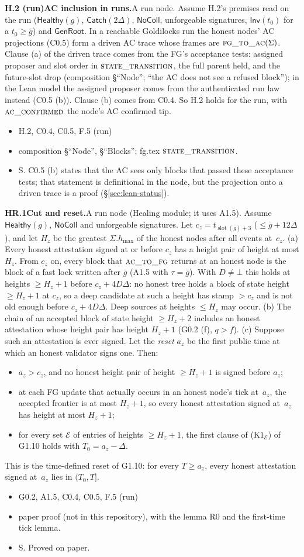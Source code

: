 \documentclass{article}
\newcommand{\slot}{\operatorname{slot}}
\newcommand{\hmax}{h_{\max}}
\newcommand{\fname}[1]{\text{\textsc{#1}}}
\newcommand{\dagnode}[6]{%
\par\medskip\noindent\textbf{#1\enspace #2.}\enspace #3
\begin{itemize}[leftmargin=2.2em,itemsep=0pt,topsep=2pt]
\item[\emph{Uses}] #4
\item[\emph{Evid.}] #5
\item[\emph{Task}] #6
\end{itemize}}
\begin{document}
\dagnode{H.2 (run)}{AC inclusion in runs}{A run node.  Assume H.2's premises
read on the run ($\mathsf{Healthy}(g)$, $\mathsf{Catch}(2\Delta)$,
$\mathsf{NoColl}$, unforgeable signatures, $\mathsf{Inv}(t_0)$ for a
$t_0\geq\bar g$) and
$\mathsf{GenRoot}$.  In a reachable
Goldilocks run the honest nodes' AC projections (C0.5) form a driven
AC trace whose frames are $\fname{fg\_to\_ac}(\Sigma)$.  Clause (a) of the
driven trace comes from the FG's acceptance tests: assigned proposer and
slot order in $\fname{state\_transition}$, the full parent held, and the
future-slot drop (composition \S``Node''; ``the AC does not see a refused
block''); in the Lean model the assigned proposer comes from the authenticated
run law instead (C0.5 (b)).  Clause (b) comes from C0.4.  So H.2 holds for the
run, with $\fname{ac\_confirmed}$ the node's AC confirmed tip.}
{H.2, C0.4, C0.5, F.5 (run)}
{composition \S``Node'', \S``Blocks''; fg.tex $\fname{state\_transition}$.}
{S.  C0.5 (b) states that the AC sees only blocks that passed these
acceptance tests; that statement is definitional in the
node, but the projection onto a driven trace is a proof
(\S\ref{sec:lean-status}).}

\dagnode{HR.1}{Cut and reset}{A run node (Healing module; it uses A1.5).
Assume $\mathsf{Healthy}(g)$, $\mathsf{NoColl}$ and unforgeable signatures.
Let $c_z=t_{\slot(\bar g)+3}$ ($\leq\bar g+12\Delta$), and let $H_z$ be the
greatest $\Sigma.\hmax$ of the honest nodes after all events at~$c_z$.
(a) Every honest attestation signed at or before $c_z$ has a height pair of
height at most $H_z$.  From $c_z$ on, every block that $\fname{ac\_to\_fg}$
returns at an honest node is the block of a fast lock written after
$\bar g$ (A1.5 with $\tau=\bar g$).  With $D\neq\bot$ this holds at heights
$\geq H_z+1$ before $c_z+4D\Delta$: no honest tree holds a block of state height
$\geq H_z+1$ at $c_z$, so a deep candidate at such a height has stamp $>c_z$ and
is not old enough before $c_z+4D\Delta$.  Deep sources at heights $\leq H_z$
may occur.
(b) The chain of an accepted block of state height $\geq H_z+2$ includes an
honest attestation whose height pair has height $H_z+1$ (G0.2 (f), $q>f$).
(c) Suppose such an attestation is ever signed.  Let the \emph{reset} $a_z$
be the first public time at which an honest validator signs one.  Then:
\begin{itemize}[itemsep=0pt,topsep=2pt]
\item $a_z>c_z$, and no honest height pair of height $\geq H_z+1$ is signed
  before $a_z$;
\item at each FG update that actually occurs in an honest node's tick at~$a_z$, the accepted
  frontier is at most $H_z+1$, so every honest attestation signed at~$a_z$ has height
  at most $H_z+1$;
\item for every set $\mathcal E$ of entries of heights $\geq H_z+1$, the
  first clause of ($\mathrm K1_{\mathcal E}$) of G1.10 holds with
  $T_0=a_z-\Delta$.
\end{itemize}
This is the time-defined reset of G1.10: for every $T\geq a_z$, every honest
attestation signed at~$a_z$ lies in $(T_0,T]$.}
{G0.2, A1.5, C0.4, C0.5, F.5 (run)}
{paper proof (not in this repository), with the lemma R0 and the first-time
tick lemma.}
{S.  Proved on paper.}
\end{document}
